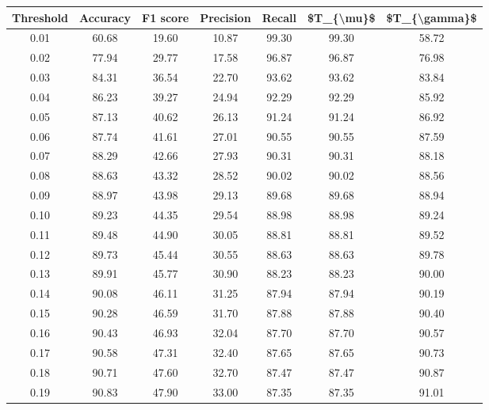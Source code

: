 \begin{tabular}{|c|c|c|c|c|c|c|}
\toprule
 Threshold &  Accuracy &  F1 score &  Precision &  Recall &  \$T\_\{\textbackslash mu\}\$ &  \$T\_\{\textbackslash gamma\}\$ \\
\hline
      0.01 &     60.68 &     19.60 &      10.87 &   99.30 &      99.30 &         58.72 \\
      0.02 &     77.94 &     29.77 &      17.58 &   96.87 &      96.87 &         76.98 \\
      0.03 &     84.31 &     36.54 &      22.70 &   93.62 &      93.62 &         83.84 \\
      0.04 &     86.23 &     39.27 &      24.94 &   92.29 &      92.29 &         85.92 \\
      0.05 &     87.13 &     40.62 &      26.13 &   91.24 &      91.24 &         86.92 \\
      0.06 &     87.74 &     41.61 &      27.01 &   90.55 &      90.55 &         87.59 \\
      0.07 &     88.29 &     42.66 &      27.93 &   90.31 &      90.31 &         88.18 \\
      0.08 &     88.63 &     43.32 &      28.52 &   90.02 &      90.02 &         88.56 \\
      0.09 &     88.97 &     43.98 &      29.13 &   89.68 &      89.68 &         88.94 \\
      0.10 &     89.23 &     44.35 &      29.54 &   88.98 &      88.98 &         89.24 \\
      0.11 &     89.48 &     44.90 &      30.05 &   88.81 &      88.81 &         89.52 \\
      0.12 &     89.73 &     45.44 &      30.55 &   88.63 &      88.63 &         89.78 \\
      0.13 &     89.91 &     45.77 &      30.90 &   88.23 &      88.23 &         90.00 \\
      0.14 &     90.08 &     46.11 &      31.25 &   87.94 &      87.94 &         90.19 \\
      0.15 &     90.28 &     46.59 &      31.70 &   87.88 &      87.88 &         90.40 \\
      0.16 &     90.43 &     46.93 &      32.04 &   87.70 &      87.70 &         90.57 \\
      0.17 &     90.58 &     47.31 &      32.40 &   87.65 &      87.65 &         90.73 \\
      0.18 &     90.71 &     47.60 &      32.70 &   87.47 &      87.47 &         90.87 \\
      0.19 &     90.83 &     47.90 &      33.00 &   87.35 &      87.35 &         91.01 \\

\end{tabular}
